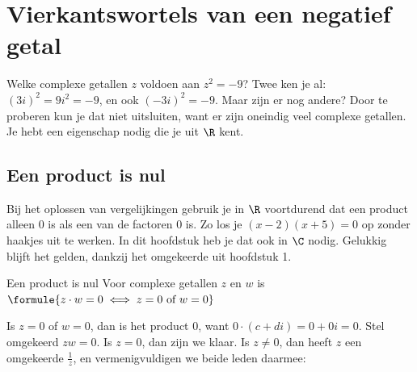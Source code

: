 \begin{oefeningen}[Start]

\end{oefeningen}


\section{Vierkantswortels van een negatief getal}

Welke complexe getallen $z$ voldoen aan $z^2 = -9$? Twee ken je al: $(3i)^2 = 9i^2 = -9$, en ook $(-3i)^2 = -9$. Maar zijn er nog andere? Door te proberen kun je dat niet uitsluiten, want er zijn oneindig veel complexe getallen. Je hebt een eigenschap nodig die je uit $\R$ kent.

\subsection{Een product is nul}

Bij het oplossen van vergelijkingen gebruik je in $\R$ voortdurend dat een product alleen 0 is als een van de factoren 0 is. Zo los je $(x - 2)(x + 5) = 0$ op zonder haakjes uit te werken. In dit hoofdstuk heb je dat ook in $\C$ nodig. Gelukkig blijft het gelden, dankzij het omgekeerde uit hoofdstuk 1.

\begin{theorie}
\begin{stelling}{Een product is nul}
Voor complexe getallen $z$ en $w$ is \quad $\formule{z \cdot w = 0 \iff z = 0 \text{ of } w = 0}$
\end{stelling}

\begin{bewijs}
Is $z = 0$ of $w = 0$, dan is het product 0, want $0 \cdot (c + di) = 0 + 0i = 0$. Stel omgekeerd $zw = 0$. Is $z = 0$, dan zijn we klaar. Is $z \neq 0$, dan heeft $z$ een omgekeerde $\frac{1}{z}$, en vermenigvuldigen we beide leden daarmee:
\end{bewijs}
\end{theorie}

